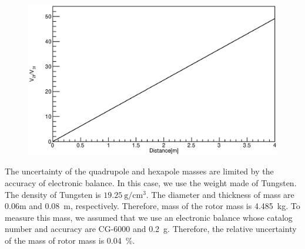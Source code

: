 \documentclass[A4]{spie}  %
\begin{document}
\begin{figure}
\begin{center}
\includegraphics[width=12cm]{dvsVV.eps}
\caption{}
\label{fig:dvsVV}
\end{center}
\end{figure}
The uncertainty of the quadrupole and hexapole masses are limited by the accuracy of electronic balance. In this case, we use the weight made of Tungsten. The density of Tungsten is $19.25~\mathrm{g/cm^3}$. The diameter and thickness of mass are 0.06m and 0.08~m, respectively. Therefore, mass of the rotor mass is 4.485~kg. To measure this mass, we assumed that we use an electronic balance whose catalog number and accuracy are CG-6000 and 0.2~g. Therefore, the relative uncertainty of the mass of rotor mass is 0.04~\%.
\end{document}
